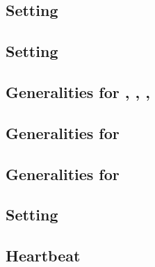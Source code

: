 \subsection{Setting \accInputs{}}                                           \label{bls data: setting acc pairings}                               
\subsection{Setting \malformedDataInternalJustification{}}                  \label{bls data: malformed data internal justification}                

\subsection{Generalities for \cOneMembershipTestRequired{}, \cTwoMembershipTestRequired{}, \gOneMembershipTestRequired{}, \gTwoMembershipTestRequired{}}                     \label{bls: generalities for membership test}                        

\subsection{Generalities for \pairOfPointsContainsInfinity{}}               \label{bls data: generalities for pair of points contains infinity}  
\subsection{Generalities for \acceptablePairOfPoints{}}                     \label{bls data: generalities for acceptable pairs of points}        

\subsection{Setting \trivialAcc{}}                                         \label{bls: setting trivial}                                           

\subsection{Heartbeat}                                                      \label{bls data: heartbeat}                                          
